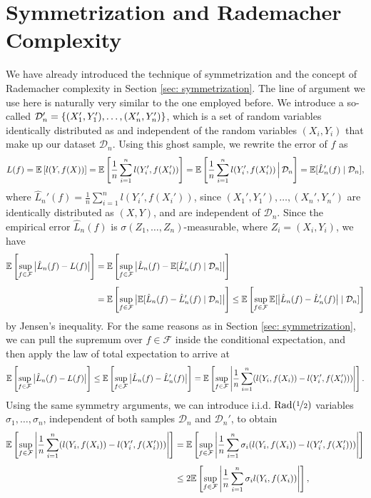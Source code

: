 \section{Symmetrization and Rademacher Complexity}

We have already introduced the technique of symmetrization and the concept of Rademacher complexity in Section \ref{sec: symmetrization}. The line of argument we use here is naturally very similar to the one employed before. We introduce a so-called  $\mathcal{D}_n' = \left\{(X_1', Y_1'), \dots, (X_n', Y_n')\right\}$, which is a set of random variables identically distributed as and independent of the random variables $(X_i, Y_i)$ that make up our dataset $\mathcal{D}_n$. Using this ghost sample, we rewrite the error of $f$ as
\[
    L(f) = \mathbb{E}\left[l(Y, f(X))\right] = \mathbb{E}\left[\frac{1}{n} \sum_{i=1}^n l(Y_i', f(X_i'))\right] = \mathbb{E}\left[\frac{1}{n} \sum_{i=1}^n l(Y_i', f(X_i')) \,\Big\vert\, \mathcal{D}_n\right] = \mathbb{E}[\hat L_n'(f) \mathrel{|} \mathcal{D}_n],
\]
where $\hat L_n'(f) = \frac{1}{n} \sum_{i=1}^n l(Y_i', f(X_i'))$, since $(X_1', Y_1'), \dots, (X_n', Y_n')$ are identically distributed as $(X, Y)$, and are independent of $\mathcal{D}_n$. Since the empirical error $\hat L_n(f)$ is $\sigma(Z_1, \dots, Z_n)$-measurable, where $Z_i = (X_i, Y_i)$, we have
\begin{align*}
    \mathbb{E}\left[ \sup_{f \in \mathcal{F}} \big\lvert\hat L_n(f) - L(f)\big\rvert \right] &= \mathbb{E}\left[ \sup_{f \in \mathcal{F}} \big\lvert\hat L_n(f) - \mathbb{E}[\hat L_n'(f) \mathrel{|} \mathcal{D}_n]\big\rvert \right] \\[4pt]
        &= \mathbb{E}\left[ \sup_{f \in \mathcal{F}} \big\lvert\mathbb{E}[\hat L_n(f) -\hat L_n'(f) \mathrel{|} \mathcal{D}_n]\big\rvert \right] \leq \mathbb{E}\left[ \sup_{f \in \mathcal{F}} \mathbb{E}[ \big\lvert\hat L_n(f) -\hat L_n'(f)\big\rvert \mathrel{|} \mathcal{D}_n] \right]
\end{align*}
by Jensen's inequality. For the same reasons as in Section \ref{sec: symmetrization}, we can pull the supremum over $f \in \mathcal{F}$ inside the conditional expectation, and then apply the law of total expectation to arrive at
\[
    \mathbb{E}\left[ \sup_{f \in \mathcal{F}} \big\lvert\hat L_n(f) - L(f)\big\rvert \right] \leq \mathbb{E}\left[ \sup_{f \in \mathcal{F}} \big\lvert\hat L_n(f) -\hat L_n'(f)\big\rvert \right] = \mathbb{E}\left[ \sup_{f \in \mathcal{F}} \abs{\frac{1}{n} \sum_{i=1}^n (l(Y_i, f(X_i)) - l(Y_i', f(X_i')))} \right].
\]
Using the same symmetry arguments, we can introduce i.i.d. $\mathrm{Rad}(\nicefrac{1}{2})$ variables $\sigma_1, \dots, \sigma_n$, independent of both samples $\mathcal{D}_n$ and $\mathcal{D}_n'$, to obtain
\begin{align*}
    \mathbb{E}\left[ \sup_{f \in \mathcal{F}} \abs{\frac{1}{n} \sum_{i=1}^n (l(Y_i, f(X_i)) - l(Y_i', f(X_i')))} \right] &= \mathbb{E}\left[ \sup_{f \in \mathcal{F}} \abs{\frac{1}{n} \sum_{i=1}^n \sigma_i (l(Y_i, f(X_i)) - l(Y_i', f(X_i')))} \right] \\[4pt]
        &\leq 2 \mathbb{E}\left[ \sup_{f \in \mathcal{F}} \abs{\frac{1}{n} \sum_{i=1}^n \sigma_i l(Y_i, f(X_i))}\right],
\end{align*}
